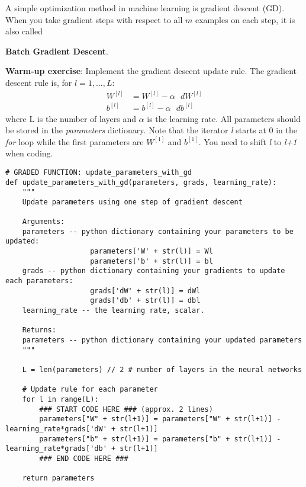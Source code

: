 A simple optimization method in machine learning is gradient descent (GD). When you take gradient steps with respect to all $m$ examples on each step, it is also called {\textbf {Batch Gradient Descent}. 

{\textbf {Warm-up exercise}}: Implement the gradient descent update rule. The  gradient descent rule is, for $l = 1, ..., L$: 
\begin{align}
W^{[l]} &= W^{[l]} - \alpha \text{ } dW^{[l]}\\
b^{[l]} &= b^{[l]} - \alpha \text{ } db^{[l]} 
\end{align}
where L is the number of layers and $\alpha$ is the learning rate. All parameters should be stored in the \emph{parameters} dictionary. Note that the iterator \emph{l} starts at 0 in the \emph{for} loop while the first parameters are $W^{[1]}$ and $b^{[1]}$. You need to shift  \emph{l} to  \emph{l+1} when coding.


\begin{verbatim}
# GRADED FUNCTION: update_parameters_with_gd
def update_parameters_with_gd(parameters, grads, learning_rate):
    """
    Update parameters using one step of gradient descent
    
    Arguments:
    parameters -- python dictionary containing your parameters to be updated:
                    parameters['W' + str(l)] = Wl
                    parameters['b' + str(l)] = bl
    grads -- python dictionary containing your gradients to update each parameters:
                    grads['dW' + str(l)] = dWl
                    grads['db' + str(l)] = dbl
    learning_rate -- the learning rate, scalar.
    
    Returns:
    parameters -- python dictionary containing your updated parameters 
    """

    L = len(parameters) // 2 # number of layers in the neural networks

    # Update rule for each parameter
    for l in range(L):
        ### START CODE HERE ### (approx. 2 lines)
        parameters["W" + str(l+1)] = parameters["W" + str(l+1)] - learning_rate*grads['dW' + str(l+1)]
        parameters["b" + str(l+1)] = parameters["b" + str(l+1)] - learning_rate*grads['db' + str(l+1)]
        ### END CODE HERE ###
        
    return parameters
\end{verbatim}

}
